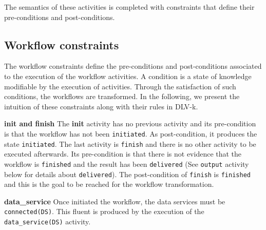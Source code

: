 %


\vspace*{0.25cm}			   
The semantics of these activities is completed with constraints that define their pre-conditions and post-conditions.
				
\subsection{Workflow constraints} 
The workflow constraints define the pre-conditions and post-conditions associated to the execution of the workflow activities. A condition is a state of knowledge modifiable by the execution of activities. Through the satisfaction of such conditions, the workflows are transformed.
In the following, we present the intuition of these constraints along with their rules in DLV-k.

               
\textbf{init and finish} The \textbf{init} activity has no previous activity and its pre-condition is that the workflow has not been \texttt{initiated}. As post-condition, it produces the state \texttt{initiated}. The last activity is \texttt{finish} and there is no other activity to be executed afterwards. Its pre-condition is that there is not evidence that the workflow is \texttt{finished} and the result has been \texttt{delivered} (See \texttt{output} activity below for details about \texttt{delivered}). The post-condition of \texttt{finish} is \texttt{finished} and this is the goal to be reached for the workflow transformation.
                            
%


\vspace*{0.25cm}        
\textbf{data\_service} Once initiated the workflow, the data services must be \texttt{connected(DS)}. This fluent is produced by the execution of the \texttt{data\_service(DS)} activity. 

%

